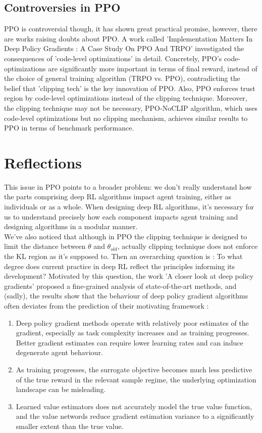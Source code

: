 \documentclass{article}
\begin{document}
\subsection{Controversies in PPO}
PPO is controversial though, it has shown great practical promise, however, there are works raising doubts about PPO. A work called 'Implementation Matters In Deep Policy Gradients : A Case Study On PPO And TRPO' investigated the consequences of 'code-level optimizations' in detail. Concretely, PPO's code-optimizations are significantly more important in terms of final reward, instead of the choice of general training algorithm (TRPO vs. PPO), contradicting the belief that 'clipping tech' is the key innovation of PPO. Also, PPO enforces trust region by code-level optimizations instead of the clipping technique. Moreover, the clipping technique may not be necessary, PPO-NoCLIP algorithm, which uses code-level optimizations but no clipping mechanism, achieves similar results to PPO in terms of benchmark performance. 

\section{Reflections}
This issue in PPO points to a broader problem: we don't really understand how the parts comprising deep RL algorithms impact agent training, either as individuals or as a whole. When designing deep RL algorithms, it's necessary for us to understand precisely how each component impacts agent training and designing algorithms in a modular manner. \\

We've also noticed that although in PPO the clipping technique is designed to limit the distance between $\theta$ and $\theta_{old}$, actually clipping technique does not enforce the KL region as it's supposed to. Then an overarching question is : To what degree does current practice in deep RL reflect the principles informing its development? Motivated by this question, the work 'A closer look at deep policy gradients' proposed a fine-grained analysis of state-of-the-art methods, and (sadly), the results show that the  behaviour of deep policy gradient algorithms often deviates from the prediction of their motivating framework : \begin{enumerate}
    \item Deep policy gradient methods operate with relatively poor estimates of the gradient, especially as task complexity increases and as training progresses. Better gradient estimates can require lower learning rates and can induce degenerate agent behaviour. 
    \item As training progresses, the surrogate objective becomes much less predictive of the true reward in the relevant sample regime, the underlying optimization landscape can be misleading.
    \item Learned value estimators does not accurately model the true value function, and the value networds reduce gradient estimation variance to a significantly smaller extent than the true value.
\end{enumerate}
\end{document}
